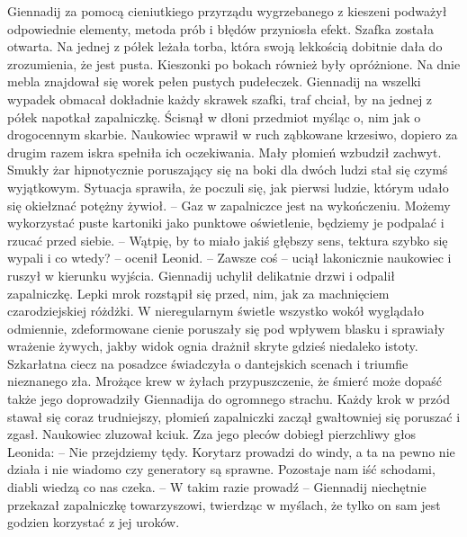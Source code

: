 \documentclass[../MAIN.tex]{subfiles}
\begin{document}
Giennadij za pomocą cieniutkiego przyrządu wygrzebanego z kieszeni podważył odpowiednie elementy, metoda prób i błędów przyniosła efekt. Szafka została otwarta. Na jednej z półek leżała torba, która swoją lekkością dobitnie dała do zrozumienia, że jest pusta. Kieszonki po bokach również były opróżnione. Na dnie mebla znajdował się worek pełen pustych pudełeczek. Giennadij na wszelki wypadek obmacał dokładnie każdy skrawek szafki, traf chciał, by na jednej z półek napotkał zapalniczkę. Ścisnął w dłoni przedmiot myśląc o, nim jak o drogocennym skarbie. Naukowiec wprawił w ruch ząbkowane krzesiwo, dopiero za drugim razem iskra spełniła ich oczekiwania. Mały płomień wzbudził zachwyt. Smukły żar hipnotycznie poruszający się na boki dla dwóch ludzi stał się czymś wyjątkowym. Sytuacja sprawiła, że poczuli się, jak pierwsi ludzie, którym udało się okiełznać potężny żywioł. 
-- Gaz w zapalniczce jest na wykończeniu. Możemy wykorzystać puste kartoniki jako punktowe oświetlenie, będziemy je podpalać i rzucać przed siebie. 
-- Wątpię, by to miało jakiś głębszy sens, tektura szybko się wypali i co wtedy? -- ocenił Leonid. 
-- Zawsze coś -- uciął lakonicznie naukowiec i ruszył w kierunku wyjścia. 
Giennadij uchylił delikatnie drzwi i odpalił zapalniczkę. Lepki mrok rozstąpił się przed, nim, jak za machnięciem czarodziejskiej różdżki. W nieregularnym świetle wszystko wokół wyglądało odmiennie, zdeformowane cienie poruszały się pod wpływem blasku i sprawiały wrażenie żywych, jakby widok ognia drażnił skryte gdzieś niedaleko istoty. Szkarłatna ciecz na posadzce świadczyła o dantejskich scenach i triumfie nieznanego zła. Mrożące krew w żyłach przypuszczenie, że śmierć może dopaść także jego doprowadziły Giennadija do ogromnego strachu. Każdy krok w przód stawał się coraz trudniejszy, płomień zapalniczki zaczął gwałtowniej się poruszać i zgasł. Naukowiec zluzował kciuk. Zza jego pleców dobiegł pierzchliwy głos Leonida: 
-- Nie przejdziemy tędy. Korytarz prowadzi do windy, a ta na pewno nie działa i nie wiadomo czy generatory są sprawne. Pozostaje nam iść schodami, diabli wiedzą co nas czeka. 
-- W takim razie prowadź -- Giennadij niechętnie przekazał zapalniczkę towarzyszowi, twierdząc w myślach, że tylko on sam jest godzien korzystać z jej uroków. 
\end{document}
